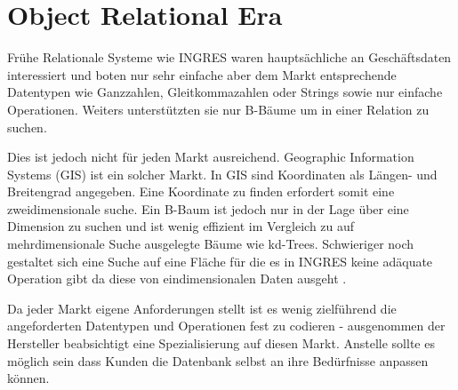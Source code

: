 \section{Object Relational Era}

Frühe Relationale Systeme wie INGRES waren hauptsächliche an Geschäftsdaten interessiert und boten nur sehr einfache aber dem Markt entsprechende Datentypen wie Ganzzahlen, Gleitkommazahlen oder Strings sowie nur einfache Operationen. Weiters unterstützten sie nur B-Bäume um in einer Relation zu suchen.

Dies ist jedoch nicht für jeden Markt ausreichend. Geographic Information Systems (GIS) ist ein solcher Markt. In GIS sind Koordinaten als Längen- und Breitengrad angegeben. Eine Koordinate zu finden erfordert somit eine zweidimensionale suche. Ein B-Baum ist jedoch nur in der Lage über eine Dimension zu suchen und ist wenig effizient im Vergleich zu auf mehrdimensionale Suche ausgelegte Bäume wie kd-Trees. Schwieriger noch gestaltet sich eine Suche auf eine Fläche für die es in INGRES keine adäquate Operation gibt da diese von eindimensionalen Daten ausgeht \cite{stonebraker2005}.

Da jeder Markt eigene Anforderungen stellt ist es wenig zielführend die angeforderten Datentypen und Operationen fest zu codieren - ausgenommen der Hersteller beabsichtigt eine Spezialisierung auf diesen Markt. Anstelle sollte es möglich sein dass Kunden die Datenbank selbst an ihre Bedürfnisse anpassen können.


